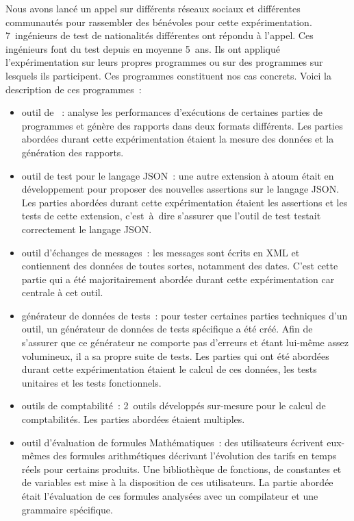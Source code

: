 Nous avons lancé un appel sur différents réseaux sociaux et différentes
communautés pour rassembler des bénévoles pour cette expérimentation.
7~ingénieurs de test de nationalités différentes ont répondu à l'appel. Ces
ingénieurs font du test depuis en moyenne 5~ans. Ils ont appliqué
l'expérimentation sur leurs propres programmes ou sur des programmes sur
lesquels ils participent. Ces programmes constituent nos cas concrets. Voici la
description de ces programmes~:
%
\begin{itemize}

\item outil de ~: analyse les performances d'exécutions de
certaines parties de programmes et génère des rapports dans deux formats
différents. Les parties abordées durant cette expérimentation étaient la mesure
des données et la génération des rapports.

\item outil de test pour le langage JSON~: une autre extension à atoum était en
développement pour proposer des nouvelles assertions sur le langage JSON. Les
parties abordées durant cette expérimentation étaient les assertions et les
tests de cette extension, c'est~à~dire s'assurer que l'outil de test testait
correctement le langage JSON.

\item outil d'échanges de messages~: les messages sont écrits en XML et
contiennent des données de toutes sortes, notamment des dates. C'est cette
partie qui a été majoritairement abordée durant cette expérimentation car
centrale à cet outil.

\item générateur de données de tests~: pour tester certaines parties techniques
d'un outil, un générateur de données de tests spécifique a été créé. Afin de
s'assurer que ce générateur ne comporte pas d'erreurs et étant lui-même assez
volumineux, il a sa propre suite de tests. Les parties qui ont été abordées
durant cette expérimentation étaient le calcul de ces données, les tests
unitaires et les tests fonctionnels.

\item outils de comptabilité~: 2~outils développés sur-mesure pour le calcul de
comptabilités. Les parties abordées étaient multiples.

\item outil d'évaluation de formules Mathématiques~: des utilisateurs écrivent
eux-mêmes des formules arithmétiques décrivant l'évolution des tarifs en temps
réels pour certains produits. Une bibliothèque de fonctions, de constantes et de
variables est mise à la disposition de ces utilisateurs. La partie abordée était
l'évaluation de ces formules analysées avec un compilateur et une grammaire
spécifique.

\end{itemize}

